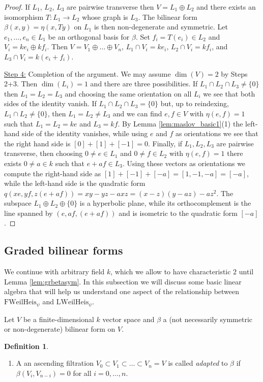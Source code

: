 \documentclass{article}
\def\ul#1{\underline{#1}}
\theoremstyle{definition}
\newtheorem{dfn}[thm]{Definition}
\numberwithin{equation}{subsection}
\renewcommand{\-}{\hyp{}}
\begin{document}
\begin{appendices}
\begin{proof}
	If $L_1$, $L_2$, $L_3$ are pairwise transverse then $V=L_1 \oplus L_2$ and there exists an isomorphism $T : L_1 \to L_2$ whose graph is $L_3$. The bilinear form $\beta(x,y)=\eta(x,Ty)$ on $L_1$ is then non-degenerate and symmetric. Let $e_1,\dots,e_n \in L_1$ be an orthogonal basis for $\beta$. Set $f_i=T(e_i) \in L_2$ and $V_i=ke_i \oplus kf_i$. Then $V=V_1 \oplus \dots \oplus V_n$, $L_1 \cap V_i=ke_i$, $L_2 \cap V_i=kf_i$, and $L_3 \cap V_i=k(e_i+f_i)$.

	\ul{Step 4:} Completion of the argument. We may assume $\dim(V)=2$ by Steps 2+3. Then $\dim(L_i)=1$ and there are three possibilities. If $L_1 \cap L_2 \cap L_3 \neq \{0\}$ then $L_1=L_2=L_3$ and choosing the same orientation on all $L_i$ we see that both sides of the identity vanish. If $L_1 \cap L_2 \cap L_3 = \{0\}$ but, up to reindexing, $L_1 \cap L_2 \neq \{0\}$, then $L_1=L_2 \neq L_3$ and we can find $e,f \in V$ with $\eta(e,f)=1$ such that $L_1=L_2=ke$ and $L_3=kf$. By Lemma \ref{lem:maslov_basic1}(1) the left-hand side of the identity vanishes, while using $e$ and $f$ as orientations we see that the right hand side is $[0]+[1]+[-1]=0$. Finally, if $L_1,L_2,L_3$ are pairwise transverse, then choosing $0 \neq e \in L_1$ and $0 \neq f \in L_2$ with $\eta(e,f)=1$ there exists $0 \neq a \in k$ such that $e+af \in L_3$. Using these vectors as orientations we compute the right-hand side as $[1]+[-1]+[-a]=[1,-1,-a]=[-a]$, while the left-hand side is the quadratic form $q(xe,yf,z(e+af))=xy-yz-axz=(x-z)(y-az)-az^2$. The subspace $L_1 \oplus L_2 \oplus \{0\}$ is a hyperbolic plane, while its orthocomplement is the line spanned by $(e,af,(e+af))$ and is isometric to the quadratic form $[-a]$.
\end{proof}

\subsection{Graded bilinear forms} \label{sub:gradedbf}

We continue with arbitrary field $k$, which we allow to have characteristic $2$ until Lemma \ref{lem:grbetasym}.
In this subsection we will discuss some basic linear algebra that will help us understand one aspect of the relationship between $\mathrm{FWeilHeis}_\psi$ and $\mathrm{LWeilHeis}_\psi$.

Let $V$ be a finite-dimensional $k$ vector space and $\beta$ a (not necessarily symmetric or non-degenerate) bilinear form on $V$.

\begin{dfn} \label{dfn:grbeta}
	\begin{enumerate}
		\item A an ascending filtration $V_0 \subset V_1 \subset \dots \subset V_n=V$ is called \emph{adapted} to $\beta$ if $\beta(V_i,V_{n-i})=0$ for all $i=0,\dots,n$.
		

\end{enumerate}
\end{dfn}
\end{appendices}
\end{document}
